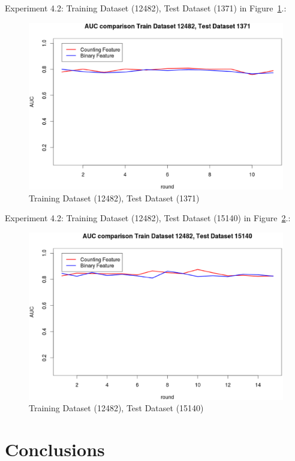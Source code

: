 \documentclass{sig-alternate}
\begin{document}
Experiment 4.2: Training Dataset  (12482), Test Dataset  (1371) in Figure~\ref{fig:fig10}.:
\begin{figure}[h]
\centering
\includegraphics[width=\columnwidth]{12482_1371.eps}
\caption{Training Dataset  (12482), Test Dataset  (1371)}
\label{fig:fig10}
\end{figure}

Experiment 4.2: Training Dataset  (12482), Test Dataset  (15140) in Figure~\ref{fig:fig11}.:
\begin{figure}[h]
\centering
\includegraphics[width=\columnwidth]{12482_15140.eps}
\caption{Training Dataset  (12482), Test Dataset  (15140)}
\label{fig:fig11}
\end{figure}








\section{Conclusions}
 
\end{document}
